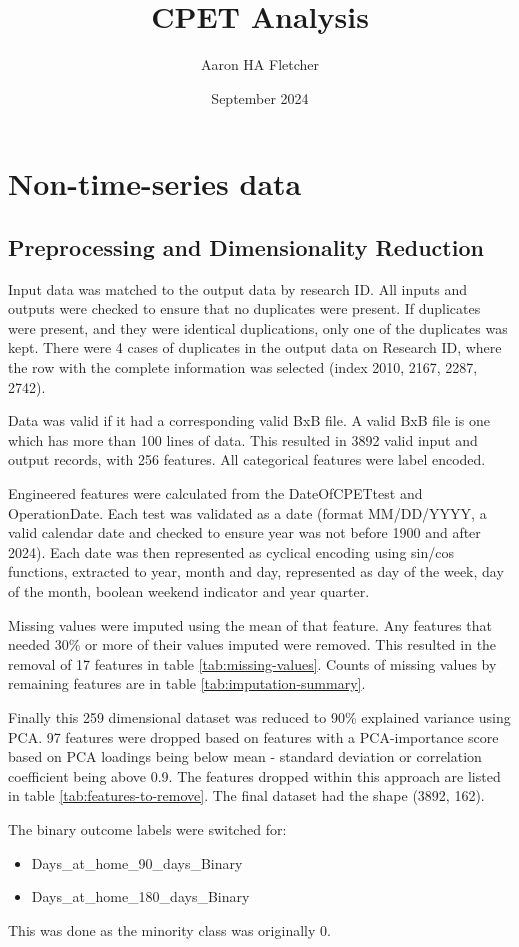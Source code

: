 \documentclass{article}
\title{CPET Analysis}
\author{Aaron HA Fletcher}
\date{September 2024}
\begin{document}
\maketitle

\section{Non-time-series data}
\subsection{Preprocessing and Dimensionality Reduction}
Input data was matched to the output data by research ID. All inputs and outputs were checked to ensure that no duplicates were present. If duplicates were present, and they were identical duplications, only one of the duplicates was kept. There were 4 cases of duplicates in the output data on Research ID, where the row with the complete information was selected (index 2010, 2167, 2287, 2742).

Data was valid if it had a corresponding valid BxB file. A valid BxB file is one which has more than 100 lines of data.
This resulted in 3892 valid input and output records, with 256 features. All categorical features were label encoded.

Engineered features were calculated from the DateOfCPETtest and OperationDate. Each test was validated as a date (format MM/DD/YYYY, a valid calendar date and checked to ensure year was not before 1900 and after 2024). Each date was then represented as cyclical encoding using sin/cos functions, extracted to year, month and day, represented as day of the week, day of the month, boolean weekend indicator and year quarter.

Missing values were imputed using the mean of that feature. Any features that needed 30\% or more of their values imputed were removed. This resulted in the removal of 17 features in table \ref{tab:missing-values}. Counts of missing values by remaining features are in table \ref{tab:imputation-summary}.

Finally this 259 dimensional dataset was reduced to 90\% explained variance using PCA. 97 features were dropped based on features with a PCA-importance score based on PCA loadings being below mean - standard deviation or correlation coefficient being above 0.9. The features dropped within this approach are listed in table \ref{tab:features-to-remove}. The final dataset had the shape (3892, 162).

The binary outcome labels were switched for:
\begin{itemize}
    \item Days\_at\_home\_90\_days\_Binary
    \item Days\_at\_home\_180\_days\_Binary
\end{itemize}
This was done as the minority class was originally 0.
\end{document}
